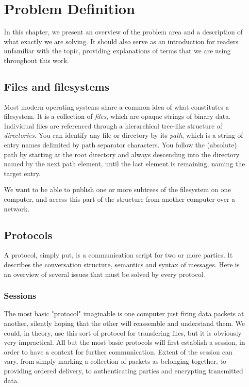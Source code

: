 
\chapter{Problem Definition}

In this chapter, we present an overview of the problem area and a description of what exactly we are solving.
It should also serve as an introduction for readers unfamiliar with the topic, providing explanations of terms
that we are using throughout this work.


\section{Files and filesystems}

Most modern operating systems share a common idea of what constitutes a filesystem. It is a collection of {\it
files}, which are opaque strings of binary data. Individual files are referenced through a hierarchical
tree-like structure of {\it directories}.  You can identify any file or directory by its {\it path}, which is
a string of entry names delimited by path separator characters\footnotemark[1]. You follow the (absolute) path
by starting at the root directory and always descending into the directory named by the next path element,
until the last element is remaining, naming the target entry.

We want to be able to publish one or more subtrees of the filesystem on one computer, and access this part of
the structure from another computer over a network.


\section{Protocols}

A protocol, simply put, is a communication script for two or more parties. It describes the conversation
structure, semantics and syntax of messages. Here is an overview of several issues that must be solved by
every protocol.


\subsection{Sessions}

The most basic "protocol" imaginable is one computer just firing data packets at another, silently hoping that
the other will reassemble and understand them. We could, in theory, use this sort of protocol for transfering
files, but it is obviously very impractical. All but the most basic protocols will first establish a session,
in order to have a context for further communication. Extent of the session can vary, from simply marking
a collection of packets as belonging together, to providing ordered delivery, to authenticating parties and
encrypting transmitted data.

